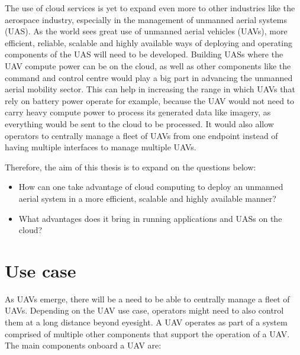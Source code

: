 The use of cloud services is yet to expand even more to other industries like the aerospace industry, especially in the management of unmanned aerial systems (UAS). As the world sees great use of unmanned aerial vehicles (UAVs), more efficient, reliable, scalable and highly available ways of deploying and operating components of the UAS will need to be developed. Building UASs where the UAV compute power can be on the cloud, as well as other components like the command and control centre would play a big part in advancing the unmanned aerial mobility sector. This can help in increasing the range in which UAVs that rely on battery power operate for example, because the UAV would not need to carry heavy compute power to process its generated data like imagery, as everything would be sent to the cloud to be processed. It would also allow operators to centrally manage a fleet of UAVs from one endpoint instead of having multiple interfaces to manage multiple UAVs.

Therefore, the aim of this thesis is to expand on the questions below:

\begin{itemize}
    \item How can one take advantage of cloud computing to deploy an unmanned aerial system in a more efficient, scalable and highly available manner?
    \item What advantages does it bring in running applications and UASs on the cloud?
\end{itemize}




\section{Use case}
\label{sec:use-case}

As UAVs emerge, there will be a need to be able to centrally manage a fleet of UAVs. Depending on the UAV use case, operators might need to also control them at a long distance beyond eyesight. A UAV operates as part of a system comprised of multiple other components that support the operation of a UAV. The main components onboard a UAV are:

